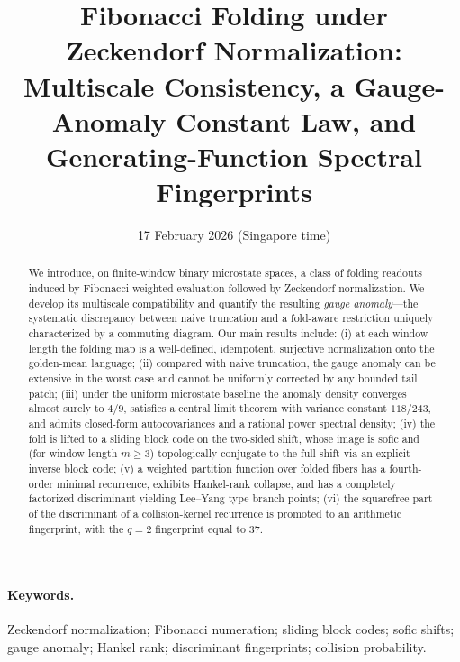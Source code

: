 

\title{Fibonacci Folding under Zeckendorf Normalization:\\
Multiscale Consistency, a Gauge-Anomaly Constant Law, and Generating-Function Spectral Fingerprints}
\author{}
\date{17 February 2026 (Singapore time)}


\maketitle

\begin{abstract}
We introduce, on finite-window binary microstate spaces, a class of folding readouts induced by Fibonacci-weighted evaluation followed by Zeckendorf normalization. We develop its multiscale compatibility and quantify the resulting \emph{gauge anomaly}---the systematic discrepancy between naive truncation and a fold-aware restriction uniquely characterized by a commuting diagram. Our main results include: (i) at each window length the folding map is a well-defined, idempotent, surjective normalization onto the golden-mean language; (ii) compared with naive truncation, the gauge anomaly can be extensive in the worst case and cannot be uniformly corrected by any bounded tail patch; (iii) under the uniform microstate baseline the anomaly density converges almost surely to \(4/9\), satisfies a central limit theorem with variance constant \(118/243\), and admits closed-form autocovariances and a rational power spectral density; (iv) the fold is lifted to a sliding block code on the two-sided shift, whose image is sofic and (for window length \(m\ge 3\)) topologically conjugate to the full shift via an explicit inverse block code; (v) a weighted partition function over folded fibers has a fourth-order minimal recurrence, exhibits Hankel-rank collapse, and has a completely factorized discriminant yielding Lee--Yang type branch points; (vi) the squarefree part of the discriminant of a collision-kernel recurrence is promoted to an arithmetic fingerprint, with the \(q=2\) fingerprint equal to \(37\).
\end{abstract}

\paragraph{Keywords.}
Zeckendorf normalization; Fibonacci numeration; sliding block codes; sofic shifts; gauge anomaly; Hankel rank; discriminant fingerprints; collision probability.

